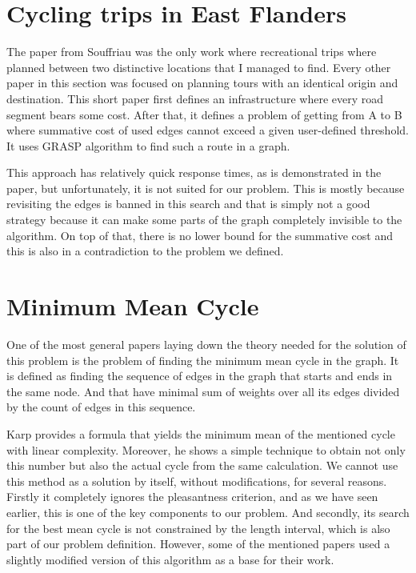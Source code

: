 \documentclass{ctuthesis}
\begin{document}
\section{Cycling trips in East Flanders}
The paper from Souffriau\cite{aop} was the only work where recreational trips where planned between two distinctive locations that I managed to find. Every other paper in this section was focused on planning tours with an identical origin and destination. This short paper first defines an infrastructure where every road segment bears some cost. After that, it defines a problem of getting from A to B where summative cost of used edges cannot exceed a given user-defined threshold. It uses GRASP\cite{grasp} algorithm to find such a route in a graph. \par This approach has relatively quick response times, as is demonstrated in the paper, but unfortunately, it is not suited for our problem. This is mostly because revisiting the edges is banned in this search and that is simply not a good strategy because it can make some parts of the graph completely invisible to the algorithm. On top of that, there is no lower bound for the summative cost and this is also in a contradiction to the problem we defined.

\section{Minimum Mean Cycle}
One of the most general papers laying down the theory needed for the solution of this problem is the problem of finding the minimum mean cycle in the graph\cite{karp}. It is defined as finding the sequence of edges in the graph that starts and ends in the same node. And that have minimal sum of weights over all its edges divided by the count of edges in this sequence. \par 
Karp provides a formula that yields the minimum mean of the mentioned cycle with linear complexity. Moreover, he shows a simple technique to obtain not only this number but also the actual cycle from the same calculation.  We cannot use this method as a solution by itself, without modifications, for several reasons. Firstly it completely ignores the pleasantness criterion, and as we have seen earlier, this is one of the key components to our problem. And secondly, its search for the best mean cycle is not constrained by the length interval, which is also part of our problem definition. However, some of the mentioned papers used a slightly modified version of this algorithm as a base for their work.
\end{document}
